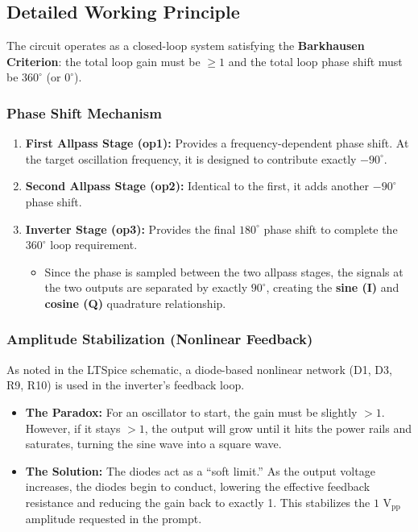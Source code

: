 \documentclass[conference]{IEEEtran}
\begin{document}
\subsection{Detailed Working Principle}
The circuit operates as a closed-loop system satisfying the \textbf{Barkhausen Criterion}: the total loop gain must be $\ge 1$ and the total loop phase shift must be $360^\circ$ (or $0^\circ$).

\subsubsection{Phase Shift Mechanism}
\begin{enumerate}
    \item \textbf{First Allpass Stage (op1):} Provides a frequency-dependent phase shift. At the target oscillation frequency, it is designed to contribute exactly \textbf{$-90^\circ$}.
    \item \textbf{Second Allpass Stage (op2):} Identical to the first, it adds another \textbf{$-90^\circ$} phase shift.
    \item \textbf{Inverter Stage (op3):} Provides the final \textbf{$180^\circ$} phase shift to complete the $360^\circ$ loop requirement.
    \begin{itemize}
        \item Since the phase is sampled between the two allpass stages, the signals at the two outputs are separated by exactly $90^\circ$, creating the \textbf{sine (I)} and \textbf{cosine (Q)} quadrature relationship.
    \end{itemize}
\end{enumerate}

\subsubsection{Amplitude Stabilization (Nonlinear Feedback)}
As noted in the LTSpice schematic, a diode-based nonlinear network (D1, D3, R9, R10) is used in the inverter's feedback loop.
\begin{itemize}
    \item \textbf{The Paradox:} For an oscillator to start, the gain must be slightly $> 1$. However, if it stays $> 1$, the output will grow until it hits the power rails and saturates, turning the sine wave into a square wave.
    \item \textbf{The Solution:} The diodes act as a ``soft limit.'' As the output voltage increases, the diodes begin to conduct, lowering the effective feedback resistance and reducing the gain back to exactly 1. This stabilizes the $1\text{ V}_{\text{pp}}$ amplitude requested in the prompt.
\end{itemize}
\end{document}
